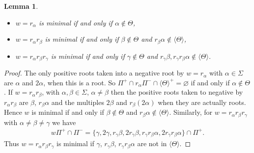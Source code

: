 \documentclass[10pt,a4paper]{amsart}
\numberwithin{equation}{section}
\newtheorem{Lemma}[Theorem]{Lemma}
\begin{document}
\begin{Lemma}\label{lm.minimalroots}\quad
\begin{itemize}\itemsep=0pt
\item $w=r_\alpha$ is minimal if and only if $\alpha\notin \Theta$,
\item $w=r_{\alpha }r_{\beta }$ is minimal if and only if $\beta \notin \Theta $ and $r_{\beta }\alpha \notin \langle\Theta\rangle $,
\item $w=r_{\alpha }r_{\beta }r_{\gamma }$ is minimal if and only if $\gamma \notin \Theta $ and $r_{\gamma }\beta,r_{\gamma }r_{\beta }\alpha \notin \langle\Theta\rangle $.
\end{itemize}
\end{Lemma}

\begin{proof}The only positive roots taken into a negative root by $w=r_{\alpha }$ with $\alpha \in \Sigma $ are $\alpha $ and $2\alpha $, when this is a root. So $\Pi ^{+}\cap r_{\alpha }\Pi ^{-}\cap \langle\Theta\rangle^{+}=\varnothing $ if and only if $\alpha \notin \Theta $. If $w=r_{\alpha }r_{\beta }$, with $\alpha,\beta \in \Sigma $, $\alpha \neq
\beta $ then the positive roots taken to negative by $r_{\alpha }r_{\beta }$ are $\beta $, $r_{\beta }\alpha $ and the multiples $2\beta $ and $r_{\beta}(2\alpha )$ when they are actually roots. Hence $w$ is minimal if and only if $\beta \notin \Theta $ and $r_{\beta }\alpha \notin \langle\Theta\rangle $. Similarly, for $w=r_{\alpha}r_{\beta }r_{\gamma }$ with $\alpha \neq \beta \neq \gamma $ we have
\begin{gather*}
w\Pi ^{+}\cap \Pi ^{-}=\{\gamma,2\gamma,r_{\gamma }\beta,2r_{\gamma}\beta,r_{\gamma }r_{\beta }\alpha,2r_{\gamma }r_{\beta }\alpha \}\cap \Pi ^{+}.
\end{gather*}
Thus $w=r_{\alpha }r_{\beta }r_{\gamma }$ is minimal if $\gamma$, $r_{\gamma}\beta$, $r_{\gamma }r_{\beta }\alpha $ are not in $\langle\Theta\rangle $.
\end{proof}
\end{document}
